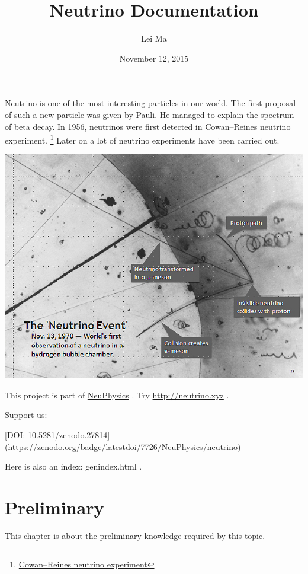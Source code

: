 \documentclass[letterpaper,12pt,english]{sphinxmanual}
\title{Neutrino Documentation}
\date{November 12, 2015}
\author{Lei Ma}
\begin{document}
\maketitle
\tableofcontents
{}\label{index::doc}


Neutrino is one of the most interesting particles in our world. The first proposal of such a new particle was given by Pauli. He managed to explain the spectrum of beta decay. In 1956, neutrinos were first detected in Cowan–Reines neutrino experiment. \footnote{
\href{https://en.wikipedia.org/wiki/Cowan\%E2\%80\%93Reines\_neutrino\_experiment}{Cowan–Reines neutrino experiment}
} Later on a lot of neutrino experiments have been carried out.

{\hfill\includegraphics{FirstNeutrinoEventAnnotated.jpg}\hfill}

This project is part of \href{http://neutrino.xyz}{NeuPhysics} . Try \href{http://neutrino.xyz}{http://neutrino.xyz} .

Support us:

{[}DOI: 10.5281/zenodo.27814{]}(\href{https://zenodo.org/badge/latestdoi/7726/NeuPhysics/neutrino}{https://zenodo.org/badge/latestdoi/7726/NeuPhysics/neutrino})

Here is also an index: genindex.html .


\chapter{Preliminary}
\label{preliminary:neutrino-physics}\label{preliminary::doc}\label{preliminary:preliminary}
This chapter is about the preliminary knowledge required by this topic.
\end{document}
